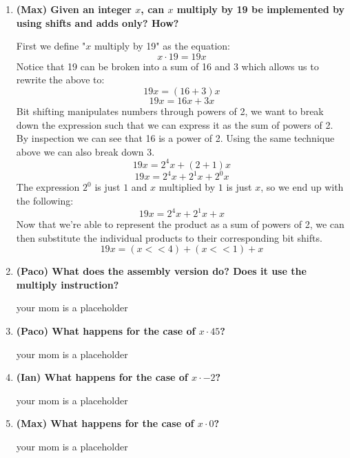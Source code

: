 \documentclass{article}
\begin{document}
\begin{enumerate}
    \item \textbf{(Max) Given an integer \( x \), can \( x \) multiply by 19 be implemented by using shifts and adds only? How?}
    
    First we define "\( x \) multiply by 19" as the equation:
    \[
    x \cdot 19 = 19x
    \]
    Notice that 19 can be broken into a sum of 16 and 3 which allows us to rewrite the above to:
    \[
    19x = (16+3)x 
    \]
    \[
    19x = 16x + 3x
    \]
    Bit shifting manipulates numbers through powers of 2, we want to break down the expression such that we
    can express it as the sum of powers of 2. By inspection we can see that 16 is a power of 2. Using the same
    technique above we can also break down 3.
    \[
    19x = 2^4x + (2+1)x
    \]
    \[
    19x = 2^4x + 2^1x + 2^0x
    \]
    The expression \(2^0\) is just \(1\) and \(x\) multiplied by \(1\) is just \(x\), so we end up with the following:
    \[
    19x = 2^4x + 2^1x + x
    \]
    Now that we're able to represent the product as a sum of powers of 2, we can then substitute the individual products
    to their corresponding bit shifts.
    \[
    19x = (x << 4) + (x << 1) + x
    \]

    \item \textbf{(Paco) What does the assembly version do? Does it use the multiply instruction?}
    
    your mom is a placeholder

    \item \textbf{(Paco) What happens for the case of \( x \cdot 45 \)?}
    
    your mom is a placeholder

    \item \textbf{(Ian) What happens for the case of \( x \cdot -2 \)?}
    
    your mom is a placeholder

    \item \textbf{(Max) What happens for the case of \( x \cdot  0 \)?}
    
    your mom is a placeholder
\end{enumerate}
\end{document}
